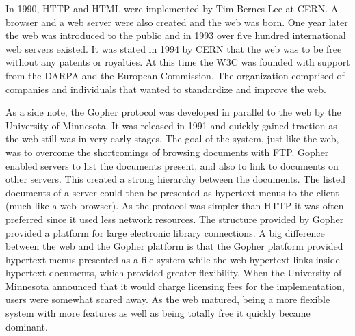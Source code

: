 \documentclass[a4paper,11pt]{kth-mag}
\begin{document}
        In 1990, \gls{HTTP} and \gls{HTML} were implemented by Tim Bernes Lee at \gls{CERN}.
        A \gls{browser} and a \gls{web} server were also created and the \gls{web} was born.
        One year later the \gls{web} was introduced to the public and in 1993 over five hundred international \gls{web} servers existed.
        It was stated in 1994 by \gls{CERN} that the \gls{web} was to be free without any patents or royalties.
        At this time the \gls{W3C} was founded with support from the \gls{DARPA} and the European Commission.
        The organization comprised of companies and individuals that wanted to standardize and improve the \gls{web}.

        As a side note, the Gopher protocol was developed in parallel to the web by the University of Minnesota.
        It was released in 1991 and quickly gained traction as the \gls{web} still was in very early stages.
        The goal of the system, just like the \gls{web}, was to overcome the shortcomings of browsing \glspl{document} with \gls{FTP}.
        Gopher enabled servers to list the \glspl{document} present, and also to link to \glspl{document} on other servers.
        This created a strong hierarchy between the \glspl{document}.
        The listed \glspl{document} of a server could then be presented as \gls{hypertext} menus to the client (much like a \gls{web} \gls{browser}).
        As the protocol was simpler than \gls{HTTP} it was often preferred since it used less network resources.
        The structure provided by Gopher provided a platform for large electronic library connections.
        A big difference between the \gls{web} and the Gopher platform is that the Gopher platform provided \gls{hypertext} menus presented as a file system while the \gls{web} \gls{hypertext} links inside \gls{hypertext} \glspl{document}, which provided greater flexibility.
        When the University of Minnesota announced that it would charge licensing fees for the implementation, users were somewhat scared away.
        As the \gls{web} matured, being a more flexible system with more features as well as being totally free it quickly became dominant.
\end{document}
